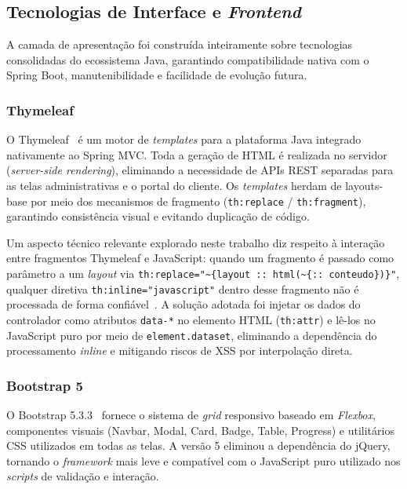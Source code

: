 \subsection{Tecnologias de Interface e \textit{Frontend}}

A camada de apresentação foi construída inteiramente sobre tecnologias
consolidadas do ecossistema Java, garantindo compatibilidade nativa com o
Spring Boot, manutenibilidade e facilidade de evolução futura.

\subsubsection{Thymeleaf}

O Thymeleaf~\cite{thymeleaf} é um motor de \textit{templates} para a
plataforma Java integrado nativamente ao Spring MVC.  Toda a geração de
HTML é realizada no servidor (\textit{server-side rendering}), eliminando a
necessidade de APIs REST separadas para as telas administrativas e o portal
do cliente.  Os \textit{templates} herdam de layouts-base por meio dos
mecanismos de fragmento (\texttt{th:replace} / \texttt{th:fragment}),
garantindo consistência visual e evitando duplicação de código.

Um aspecto técnico relevante explorado neste trabalho diz respeito à
interação entre fragmentos Thymeleaf e JavaScript: quando um fragmento é
passado como parâmetro a um \textit{layout} via
\texttt{th:replace="\textasciitilde\{layout :: html(\textasciitilde\{:: conteudo\})\}"},
qualquer diretiva \texttt{th:inline="javascript"} dentro desse fragmento
não é processada de forma confiável~\cite{thymeleaf}.  A solução adotada
foi injetar os dados do controlador como atributos \texttt{data-*} no
elemento HTML (\texttt{th:attr}) e lê-los no JavaScript puro por meio de
\texttt{element.dataset}, eliminando a dependência do processamento
\textit{inline} e mitigando riscos de XSS por interpolação direta.

\subsubsection{Bootstrap 5}

O Bootstrap 5.3.3~\cite{bootstrap5} fornece o sistema de \textit{grid}
responsivo baseado em \textit{Flexbox}, componentes visuais (Navbar, Modal,
Card, Badge, Table, Progress) e utilitários CSS utilizados em todas as
telas.  A versão 5 eliminou a dependência do jQuery, tornando o
\textit{framework} mais leve e compatível com o JavaScript puro utilizado
nos \textit{scripts} de validação e interação.

